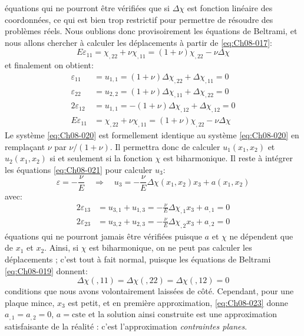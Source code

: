 équations qui ne pourront être vérifiées que si $\Delta\chi$ est fonction linéaire des coordonnées, ce qui est bien trop restrictif pour permettre de résoudre des problèmes réels.
Nous oublions donc provisoirement les équations de Beltrami, et nous allons chercher à calculer les déplacements à partir de \eqref{eq:Ch08-017}: 
\begin{equation*}
  E\varepsilon_{11}=\chi_{,22}+\nu\chi_{,11}=(1+\nu)\chi_{,22}-\nu\Delta\chi
\end{equation*}
et finalement on obtient: 
\begin{equation}
  \begin{aligned}
    \varepsilon_{11}   &  = u_{1,1} = (1+\nu) \Delta\chi_{,22}+\Delta\chi_{,11} = 0\\
    \varepsilon_{22}   &  = u_{2,2} =   (1+\nu) \Delta\chi_{,11}+\Delta\chi_{,22} = 0\\
    2\varepsilon_{12}  &  = u_{1,1} =  -(1+\nu) \Delta\chi_{,12}+\Delta\chi_{,12} = 0\\
E\varepsilon_{11}&=\chi_{,22}+\nu\chi_{,11}=(1+\nu)\chi_{,22}-\nu\Delta\chi
  \end{aligned}
\label{eq:Ch08-020}
\end{equation}
Le système \eqref{eq:Ch08-020} est formellement identique au système \eqref{eq:Ch08-020} en remplaçant $\nu$ par $\nu/(1+\nu)$.
Il permettra donc de calculer $u_1(x_1,x_2)$ et $u_2(x_1,x_2)$ si et seulement si la fonction $\chi$ est biharmonique.
Il reste à intégrer les équations \eqref{eq:Ch08-021} pour calculer $u_3$: 
\begin{equation}
  \varepsilon = - \frac{\nu}{E} \quad \Rightarrow \quad u_3 = - \frac{\nu}{E} \Delta \chi(x_1,x_2)x_3+a(x_1,x_2)
\label{eq:Ch08-022}
\end{equation}
avec:
\begin{equation}
  \begin{aligned}
     2 \varepsilon_{13} & = u_{3,1}+u_{1,3}=-\frac{\nu}{E} \Delta \chi_{,1}x_3+a_{,1} = 0 \\
     2 \varepsilon_{23} & = u_{3,2}+u_{2,3}=-\frac{\nu}{E} \Delta \chi_{,2}x_3+a_{,2} = 0
  \end{aligned}
\label{eq:Ch08-023}
\end{equation}
équations qui ne pourront jamais être vérifiées puisque $a$ et $\chi$ ne dépendent que de $x_1$ et $x_2$. 
Ainsi, si $\chi$ est biharmonique, on ne peut pas calculer les déplacements ; c'est tout à fait normal, puisque les équations de Beltrami \eqref{eq:Ch08-019} donnent: 
\begin{equation}
  \Delta \chi(,11) = \Delta \chi(,22) = \Delta \chi(,12) = 0
\label{eq:Ch08-024}
\end{equation}
conditions que nous avons volontairement laissées de côté.
Cependant, pour une plaque mince, $x_3$ est petit, et en première approximation, \eqref{eq:Ch08-023} donne $a_{,1}=a_{,2}=0$, $a=\text{cste}$ et la solution ainsi construite est une approximation satisfaisante de la réalité : c'est l'approximation \emph{contraintes planes}.
 

